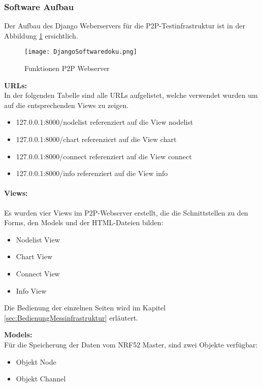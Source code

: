  \newpage
\subsubsection{Software Aufbau}\label{subsubsec:SoftwareAufbau}
Der Aufbau des Django Weberservers für die P2P-Testinfrastruktur ist in der Abbildung \ref{fig:FunktionenP2PWebserver} ersichtlich.
\begin{figure} [H]
	\centering
	\texttt{[image: DjangoSoftwaredoku.png]}
	\caption{Funktionen P2P Webserver}
	\label{fig:FunktionenP2PWebserver}
\end{figure}


\textbf{URLs: } \\
In der folgenden Tabelle sind alle URLs aufgelistet, welche verwendet wurden um auf die entsprechenden Views zu zeigen.
\begin{itemize}
	\item 127.0.0.1:8000/node\textunderscore list \hspace{2.5mm} referenziert auf die View node\textunderscore list
	\item 127.0.0.1:8000/chart \hspace{10mm} referenziert auf die View chart
	\item 127.0.0.1:8000/connect \hspace{6mm} referenziert auf die View connect
	\item 127.0.0.1:8000/info \hspace{12.5mm} referenziert auf die View info
\end{itemize} 

\vspace{5mm}
\paragraph{Views:}\label{par:Views}
Es wurden vier Views im P2P-Webserver erstellt, die die Schnittstellen zu den Forms, den Models und der HTML-Dateien bilden:
\begin{itemize}
	\item Node\textunderscore list View
	\item Chart View
	\item Connect View
	\item Info View
\end{itemize} 
Die Bedienung der einzelnen Seiten wird im Kapitel \ref{sec:BedienungMessinfrastruktur} erläutert.

\newpage
\textbf{Models: } \\
Für die Speicherung der Daten vom NRF52 Master, sind zwei Objekte verfügbar: 
\begin{itemize}
	\item Objekt Node
	\item Objekt Channel
\end{itemize} 


